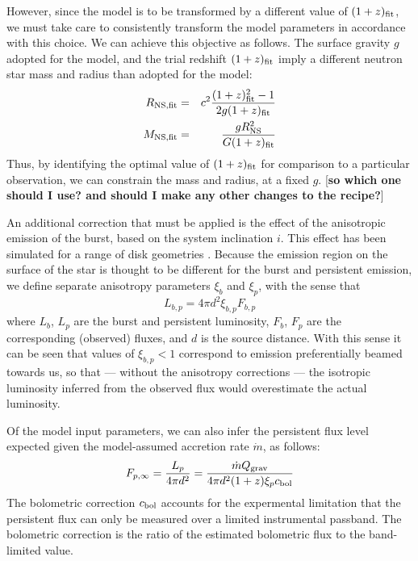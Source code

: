 \documentclass{aastex61}
\begin{document}
However, since the model is to be transformed by a different value of $(1+z)_{\rm fit}$, we must take care to consistently transform the model parameters in accordance with this choice.
%
We can achieve this objective as follows. The surface gravity $g$ adopted for the model, and the trial redshift $(1+z)_{\rm fit}$ imply a different neutron star mass and radius than adopted for the model: 
%
\begin{eqnarray}
R_{\rm NS,fit} &=& c^2\frac{(1+z)_{\rm fit}^2-1}{2g(1+z)_{\rm fit}}\\
M_{\rm NS,fit} &=& \frac{gR_{\rm NS}^2}{G(1+z)_{\rm fit}}
\end{eqnarray}
Thus, by identifying the optimal value of $(1+z)_{\rm fit}$ for comparison to a particular observation, we can constrain the mass and radius, at a fixed $g$. [{\bf so which one should I use? and should I make any other changes to the recipe?}]

An additional correction that must be applied is the effect of the anisotropic emission of the burst, based on the system inclination $i$. This effect has been simulated for a range of disk geometries \cite[e.g.][]{he16}. Because the emission region on the surface of the star is thought to be different for the burst and persistent emission, we define separate anisotropy parameters $\xi_b$ and $\xi_p$, with the sense that
\begin{equation}
L_{b,p} = 4\pi d^2\xi_{b,p}F_{b,p}
\end{equation}
where $L_b$, $L_p$ are the burst and persistent luminosity, $F_b$, $F_p$ are the corresponding (observed) fluxes, and $d$ is the source distance. With this sense it can be seen that values of $\xi_{b,p}<1$ correspond to emission preferentially beamed towards us, so that --- without the anisotropy corrections --- the isotropic luminosity inferred from the observed flux would overestimate the actual luminosity.

Of the model input parameters, we can also infer the persistent flux level expected given the model-assumed accretion rate $\dot{m}$, as follows: %
\begin{equation}
F_{p,\infty} = \frac{L_p}{4\pi d^2} = 
\frac{\dot{m} Q_{\rm grav}}{4\pi d^2 (1+z)\xi_p c_{\rm bol}}
\end{equation}
%
The bolometric correction $c_{\rm bol}$ accounts for the expermental limitation that the persistent flux can only be measured over a limited instrumental passband. The bolometric correction is the ratio of the estimated bolometric flux to the band-limited value.
\end{document}
